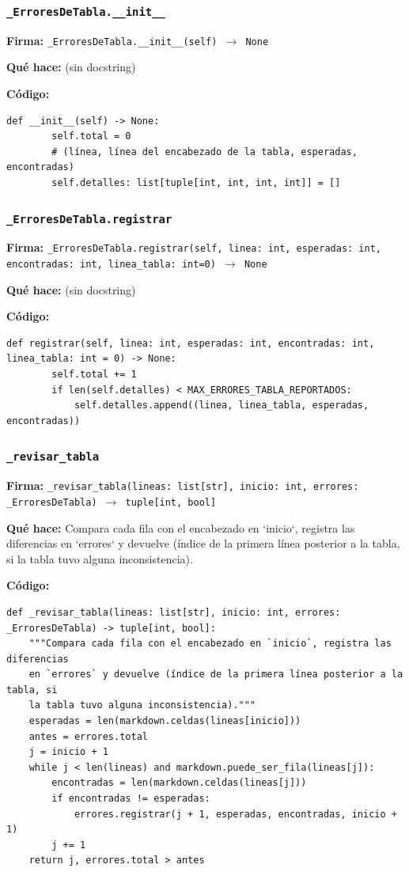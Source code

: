 \documentclass[11pt,a4paper]{article}
\begin{document}
\subsubsection*{\texttt{\_ErroresDeTabla.\_\_init\_\_}}
\textbf{Firma:} \texttt{\_ErroresDeTabla.\_\_init\_\_(self) $\rightarrow$ None}

\textbf{Qué hace:} (sin docstring)

\textbf{Código:}
\begin{lstlisting}
def __init__(self) -> None:
        self.total = 0
        # (línea, línea del encabezado de la tabla, esperadas, encontradas)
        self.detalles: list[tuple[int, int, int, int]] = []
\end{lstlisting}

\subsubsection*{\texttt{\_ErroresDeTabla.registrar}}
\textbf{Firma:} \texttt{\_ErroresDeTabla.registrar(self, linea: int, esperadas: int, encontradas: int, linea\_tabla: int=0) $\rightarrow$ None}

\textbf{Qué hace:} (sin docstring)

\textbf{Código:}
\begin{lstlisting}
def registrar(self, linea: int, esperadas: int, encontradas: int, linea_tabla: int = 0) -> None:
        self.total += 1
        if len(self.detalles) < MAX_ERRORES_TABLA_REPORTADOS:
            self.detalles.append((linea, linea_tabla, esperadas, encontradas))
\end{lstlisting}

\subsubsection*{\texttt{\_revisar\_tabla}}
\textbf{Firma:} \texttt{\_revisar\_tabla(lineas: list[str], inicio: int, errores: \_ErroresDeTabla) $\rightarrow$ tuple[int, bool]}

\textbf{Qué hace:} Compara cada fila con el encabezado en `inicio`, registra las diferencias
en `errores` y devuelve (índice de la primera línea posterior a la tabla, si
la tabla tuvo alguna inconsistencia).

\textbf{Código:}
\begin{lstlisting}
def _revisar_tabla(lineas: list[str], inicio: int, errores: _ErroresDeTabla) -> tuple[int, bool]:
    """Compara cada fila con el encabezado en `inicio`, registra las diferencias
    en `errores` y devuelve (índice de la primera línea posterior a la tabla, si
    la tabla tuvo alguna inconsistencia)."""
    esperadas = len(markdown.celdas(lineas[inicio]))
    antes = errores.total
    j = inicio + 1
    while j < len(lineas) and markdown.puede_ser_fila(lineas[j]):
        encontradas = len(markdown.celdas(lineas[j]))
        if encontradas != esperadas:
            errores.registrar(j + 1, esperadas, encontradas, inicio + 1)
        j += 1
    return j, errores.total > antes
\end{lstlisting}
\end{document}
